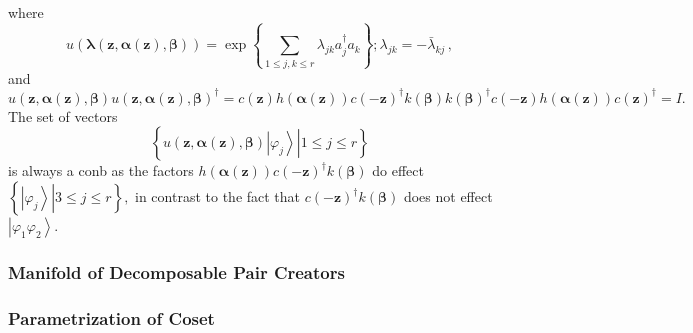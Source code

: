 \documentclass[aps,preprint]{revtex4}%
\begin{document}
where%
\begin{equation}
u\left(  \mathbf{\lambda}\left(  \mathbf{z,\alpha\left(  \mathbf{z}\right)
,\beta}\right)  \right)  =\exp\left\{  \sum\limits_{1\leq j,k\leq r}%
\lambda_{jk}a_{j}^{\dagger}a_{k}\right\}  ;\lambda_{jk}=-\bar{\lambda}_{kj}\,,
\end{equation}
and
\begin{equation}
u\left(  \mathbf{z,\alpha\left(  \mathbf{z}\right)  ,\beta}\right)  u\left(
\mathbf{z,\alpha\left(  \mathbf{z}\right)  ,\beta}\right)  ^{\dagger}=c\left(
\mathbf{z}\right)  h\left(  \mathbf{\alpha}\left(  \mathbf{z}\right)  \right)
c\left(  -\mathbf{z}\right)  ^{\dagger}k\left(  \mathbf{\beta}\right)
k\left(  \mathbf{\beta}\right)  ^{\dagger}c\left(  -\mathbf{z}\right)
h\left(  \mathbf{\alpha}\left(  \mathbf{z}\right)  \right)  c\left(
\mathbf{z}\right)  ^{\dagger}=I.
\end{equation}
The set of vectors
\begin{equation}
\left\{  \left.  u\left(  \mathbf{z,\alpha\left(  \mathbf{z}\right)  ,\beta
}\right)  \left\vert \varphi_{j}\right\rangle \right\vert 1\leq j\leq
r\right\}
\end{equation}
is always a conb as the factors $h\left(  \mathbf{\alpha}\left(
\mathbf{z}\right)  \right)  c\left(  -\mathbf{z}\right)  ^{\dagger}k\left(
\mathbf{\beta}\right)  $ do effect $\left\{  \left.  \left\vert \varphi
_{j}\right\rangle \right\vert 3\leq j\leq r\right\}  ,$ in contrast to the
fact that $c\left(  -\mathbf{z}\right)  ^{\dagger}k\left(  \mathbf{\beta
}\right)  $ does not effect $\left\vert \varphi_{1}\varphi_{2}\right\rangle .$

\subsubsection{Manifold of Decomposable Pair Creators}

\subsubsection{Parametrization of Coset}
\end{document}
